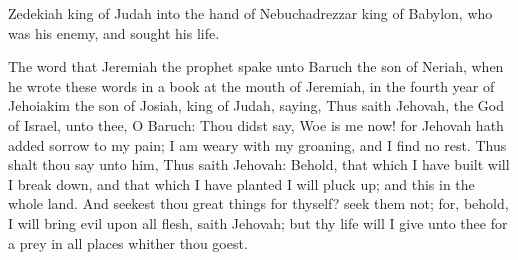 Zedekiah king of Judah into the hand of Nebuchadrezzar king of Babylon, who was his enemy, and sought his life. 

The word that Jeremiah the prophet spake unto Baruch the son of Neriah, when he wrote these words in a book at the mouth of Jeremiah, in the fourth year of Jehoiakim the son of Josiah, king of Judah, saying, Thus saith Jehovah, the God of Israel, unto thee, O Baruch: Thou didst say, Woe is me now! for Jehovah hath added sorrow to my pain; I am weary with my groaning, and I find no rest. Thus shalt thou say unto him, Thus saith Jehovah: Behold, that which I have built will I break down, and that which I have planted I will pluck up; and this in the whole land. And seekest thou great things for thyself? seek them not; for, behold, I will bring evil upon all flesh, saith Jehovah; but thy life will I give unto thee for a prey in all places whither thou goest. 

